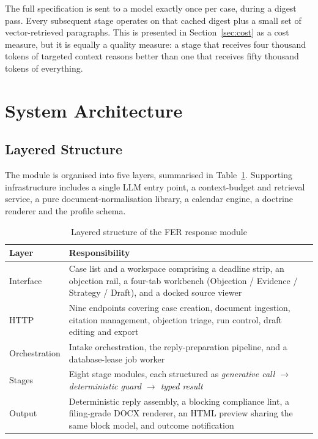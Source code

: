 \documentclass[conference]{IEEEtran}
\begin{document}
The full specification is sent to a model exactly once per case, during a digest pass. Every subsequent stage operates on that cached digest plus a small set of vector-retrieved paragraphs. This is presented in Section~\ref{sec:cost} as a cost measure, but it is equally a quality measure: a stage that receives four thousand tokens of targeted context reasons better than one that receives fifty thousand tokens of everything.

\section{System Architecture}

\subsection{Layered Structure}

The module is organised into five layers, summarised in Table~\ref{tab:layers}. Supporting infrastructure includes a single LLM entry point, a context-budget and retrieval service, a pure document-normalisation library, a calendar engine, a doctrine renderer and the profile schema.

\begin{table}[t]
\caption{Layered structure of the FER response module}
\label{tab:layers}
\centering
\renewcommand{\arraystretch}{1.25}
\begin{tabular}{@{}>{\raggedright\arraybackslash}p{}>{\raggedright\arraybackslash}p{}@{}}
\toprule
\textbf{Layer} & \textbf{Responsibility} \\
\midrule
Interface & Case list and a workspace comprising a deadline strip, an objection rail, a four-tab workbench (Objection / Evidence / Strategy / Draft), and a docked source viewer \\
HTTP & Nine endpoints covering case creation, document ingestion, citation management, objection triage, run control, draft editing and export \\
Orchestration & Intake orchestration, the reply-preparation pipeline, and a database-lease job worker \\
Stages & Eight stage modules, each structured as \emph{generative call $\rightarrow$ deterministic guard $\rightarrow$ typed result} \\
Output & Deterministic reply assembly, a blocking compliance lint, a filing-grade DOCX renderer, an HTML preview sharing the same block model, and outcome notification \\
\bottomrule
\end{tabular}
\end{table}
\end{document}
